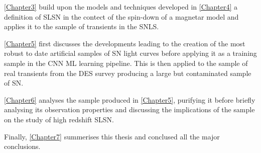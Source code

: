 \cref{Chapter3} build upon the models and techniques developed in \cref{Chapter4} a definition of SLSN in the contect of the spin-down of a magnetar model and applies it to the sample of transients in the SNLS.

\cref{Chapter5} first discusses the developments leading to the creation of the most robust to date artificial samples of SN light curves before applying it as a training sample in the CNN ML learning pipeline. This is then applied to the sample of real transients from the DES survey producing a large but contaminated sample of SN.

\cref{Chapter6} analyses the sample produced in \cref{Chapter5}, purifying it before briefly analysing its observation properties and discussing the implications of the sample on the study of high redshift SLSN.

Finally, \cref{Chapter7} summerises this thesis and conclused all the major conclusions.
